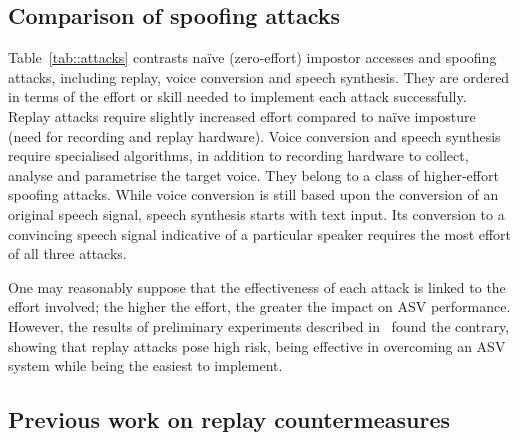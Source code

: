 




\subsection{Comparison of spoofing attacks}
\label{sec::algorithms::comparison}


Table~\ref{tab::attacks} contrasts na\"{i}ve (zero-effort) impostor accesses and spoofing attacks, including replay, voice conversion and speech synthesis.  
They are ordered in terms of the effort or skill needed to implement each attack successfully. 
Replay attacks require slightly increased effort compared to na\"{i}ve imposture (need for recording and replay hardware). 
Voice conversion and speech synthesis require specialised algorithms, in addition to recording hardware to collect, analyse and parametrise the target voice. 
They belong to a class of higher-effort spoofing attacks. 
While voice conversion is still based upon the conversion of an original speech signal, speech synthesis starts with text input. 
Its conversion to a convincing speech signal indicative of a particular speaker requires the most effort of all three attacks.

One may reasonably suppose that the effectiveness of each attack is linked to the effort involved; the higher the effort, the greater the impact on ASV performance. 
However, the results of preliminary experiments described in~\cite{Alegre2014a} found the contrary, showing that replay attacks pose high risk, being effective in overcoming an ASV system while being the easiest to implement.

\subsection{Previous work on replay countermeasures}

